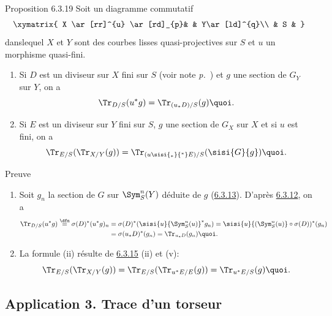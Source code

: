 \begin{enonce*}{Proposition 6.3.19}
Soit un diagramme commutatif
\[
\xymatrix{
X \ar[rr]^{u} \ar[rd]_{p}&   & Y\ar[ld]^{q}\\
  & S &
}
\]
dans\pageoriginale lequel $X$ et $Y$ sont des courbes lisses
quasi-projectives sur $S$ et $u$ un morphisme quasi-fini.
\begin{enumerate}
\renewcommand{\theenumi}{\roman{enumi}}
\renewcommand{\labelenumi}{(\theenumi)}
\item Si $D$ est un diviseur sur $X$ fini sur $S$ (voir note
\emph{p.~\pageref{XVII.note192}}) et $g$ une section de $G_{Y}$ sur $Y$, on a
\[
\Tr_{D/S}(u^{\ast}g)=\Tr_{(u_{\ast}D)/S}(g){\quoi}.
\]

\item Si $E$ est un diviseur sur $Y$ fini sur $S$, $g$ une section de
$G_{X}$ sur $X$ et si $u$ est fini, on a
\[
\Tr_{E/S}(\Tr_{X/Y}(g))=\Tr_{(u\sisi{_{\ast}}{^\ast}E)/S}(\sisi{G}{g}){\quoi}.
\]
\end{enumerate}
\end{enonce*}

\begin{enonce*}[remark]{Preuve}
\begin{enumerate}
\renewcommand{\theenumi}{\roman{enumi}}
\renewcommand{\labelenumi}{(\theenumi)}
\item Soit $g_{n}$ la section de $G$ sur $\Sym^{n}_{S}(Y)$ déduite de
$g$ (\hyperref[XVII.subsubsec6.3.13]{6.3.13}). D'après \hyperref[XVII.prop6.3.12]{6.3.12}, on a
\begin{align*}
\Tr_{D/S}(u^{\ast}g)\overset{\dfn}{=}
\sigma(D)^{\ast}(u^{\ast}g)_{n} & =\sigma(D)^{\ast}(\sisi{u}{\Sym^n_S(u)}^{\ast}g_{n})=\sisi{u}{(\Sym^n_S(u)}\circ
\sigma(D))^\ast
(g_{n})\\
& =\sigma(u_{\ast}D)^\ast(g_{n})=\Tr_{u_{\ast}D}(g_{n}){\quoi}.
\end{align*}

\item La formule (ii) résulte de \hyperref[XVII.prop6.3.15]{6.3.15} (ii) et (v):
\[
\Tr_{E/S}(\Tr_{X/Y}(g))=\Tr_{E/S}(\Tr_{u^{\ast}E/E}(g))=\Tr_{u^{\ast}E/S}(g){\quoi}.
\]
\end{enumerate}
\end{enonce*}

\subsection*{Application 3. Trace d'un torseur}


